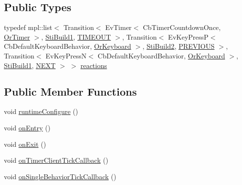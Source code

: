 \subsection*{Public Types}
\begin{DoxyCompactItemize}
\item 
typedef mpl\+::list$<$ Transition$<$ Ev\+Timer$<$ Cb\+Timer\+Countdown\+Once, \hyperlink{classsm__starcraft__ai_1_1OrTimer}{Or\+Timer} $>$, \hyperlink{structsm__starcraft__ai_1_1build__inner__states_1_1StiBuild1}{Sti\+Build1}, \hyperlink{structsm__starcraft__ai_1_1build__inner__states_1_1StiBuild3_1_1TIMEOUT}{T\+I\+M\+E\+O\+UT} $>$, Transition$<$ Ev\+Key\+PressP$<$ Cb\+Default\+Keyboard\+Behavior, \hyperlink{classsm__starcraft__ai_1_1OrKeyboard}{Or\+Keyboard} $>$, \hyperlink{structsm__starcraft__ai_1_1build__inner__states_1_1StiBuild2}{Sti\+Build2}, \hyperlink{structsm__starcraft__ai_1_1build__inner__states_1_1StiBuild3_1_1PREVIOUS}{P\+R\+E\+V\+I\+O\+US} $>$, Transition$<$ Ev\+Key\+PressN$<$ Cb\+Default\+Keyboard\+Behavior, \hyperlink{classsm__starcraft__ai_1_1OrKeyboard}{Or\+Keyboard} $>$, \hyperlink{structsm__starcraft__ai_1_1build__inner__states_1_1StiBuild1}{Sti\+Build1}, \hyperlink{structsm__starcraft__ai_1_1build__inner__states_1_1StiBuild3_1_1NEXT}{N\+E\+XT} $>$ $>$ \hyperlink{structsm__starcraft__ai_1_1build__inner__states_1_1StiBuild3_a2b857ab01ffed639b605c5931f610676}{reactions}
\end{DoxyCompactItemize}
\subsection*{Public Member Functions}
\begin{DoxyCompactItemize}
\item 
void \hyperlink{structsm__starcraft__ai_1_1build__inner__states_1_1StiBuild3_a8704c84513a0083bebca0cd42beed29b}{runtime\+Configure} ()
\item 
void \hyperlink{structsm__starcraft__ai_1_1build__inner__states_1_1StiBuild3_aa553262d3b05d3e719365fba804cbfe8}{on\+Entry} ()
\item 
void \hyperlink{structsm__starcraft__ai_1_1build__inner__states_1_1StiBuild3_a90b32bda2dd59828e21cf8bf63d182cf}{on\+Exit} ()
\item 
void \hyperlink{structsm__starcraft__ai_1_1build__inner__states_1_1StiBuild3_a73f1ba58018abc5a9c2ef617795d9987}{on\+Timer\+Client\+Tick\+Callback} ()
\item 
void \hyperlink{structsm__starcraft__ai_1_1build__inner__states_1_1StiBuild3_aa6963d70ef661d71e07be8218e29916f}{on\+Single\+Behavior\+Tick\+Callback} ()
\end{DoxyCompactItemize}
